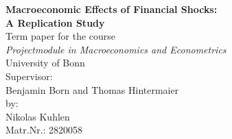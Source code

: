 \begin{titlepage}
\begin{center}

\textbf{\LARGE Macroeconomic Effects of Financial Shocks: \\A Replication Study}
\\[5cm]
\large 
Term paper for the course\\
\textit{Projectmodule in Macroeconomics and Econometrics}\\
University of Bonn\\
\vfill
Supervisor: \\
Benjamin Born and Thomas Hintermaier\\[2cm]

by:\\
Nikolas Kuhlen\\
Matr.Nr.: 2820058

\thispagestyle{empty}

\end{center}
\end{titlepage}
